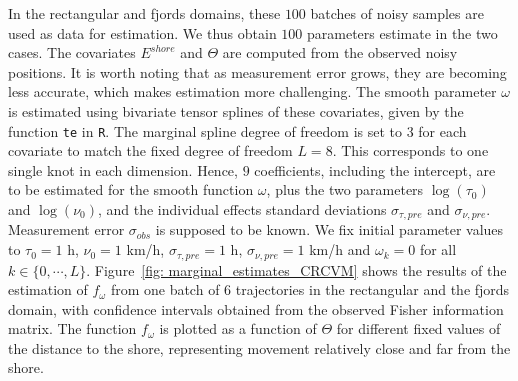 \documentclass[11pt]{article}
\newcommand {\1}{\mathbb{1}}
\begin{document}

In the rectangular and fjords domains, these $100$ batches of noisy samples are used as data for estimation. We thus obtain $100$ parameters estimate in the two cases. The covariates $E^{shore}$ and $\Theta$ are computed from the observed noisy positions. It is worth noting that as measurement error grows, they are becoming less accurate, which makes estimation more challenging. The smooth parameter $\omega$ is estimated using bivariate tensor splines of these covariates, given by the function \texttt{te} in \texttt{R}. The marginal spline degree of freedom is set to $3$ for each covariate to match the fixed degree of freedom $L=8$. This corresponds to one single knot in each dimension. Hence, $9$ coefficients, including the intercept, are to be estimated for the smooth function $\omega$, plus the two parameters $\log(\tau_0)$ and $\log(\nu_0)$, and the individual effects standard deviations $\sigma_{\tau,pre}$ and $\sigma_{\nu,pre}$. Measurement error $\sigma_{obs}$ is supposed to be known. 
We fix initial parameter values to $\tau_{0}=1$ h, $\nu_{0} = 1$ km/h, $\sigma_{\tau,pre}=1$ h, $\sigma_{\nu,pre}=1$ km/h and $\omega_k=0$ for all $k \in \{0,\cdots,L\}$. Figure~\ref{fig: marginal_estimates_CRCVM} shows the results of the estimation of $f_{\omega}$ from one batch of $6$ trajectories in the rectangular and the fjords domain, with confidence intervals obtained from the observed Fisher information matrix. The function $f_{\omega}$  is plotted as a function of $\Theta$ for different fixed values of the distance to the shore, representing movement relatively close and far from the shore.
\end{document}

